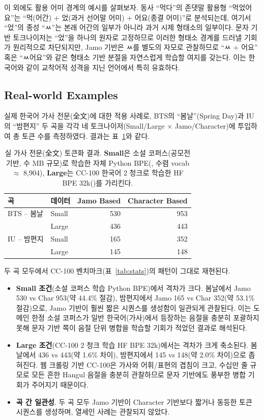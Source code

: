 \documentclass[sigconf,nonacm]{acmart}
\begin{document}
이 외에도 활용 어미 경계의 예시를 살펴보자. 동사 ``먹다''의 존댓말 활용형 ``먹었어요''는
``먹(어간) + 었(과거 선어말 어미) + 어요(종결 어미)''로 분석되는데, 여기서 ``었''의 종성 ``ㅆ''는
본래 어간의 일부가 아니라 과거 시제 형태소의 일부이다. 문자 기반 토크나이저는 ``었''을 하나의
원자로 고정하므로 이러한 형태소 경계를 드러낼 기회가 원리적으로 차단되지만, Jamo 기반은
ㅆ를 별도의 자모로 관찰하므로 ``ㅆ + 어요'' 혹은 ``ㅆ어요''와 같은 형태소 기반 분절을 자연스럽게
학습할 여지를 갖는다. 이는 한국어와 같이 교착어적 성격을 지닌 언어에서 특히 유효하다.

\subsection{Real-world Examples}

실제 한국어 가사 전문(全文)에 대한 적용 사례로, BTS의 ``봄날''(Spring Day)과 IU의
``밤편지'' 두 곡을 각각 네 토크나이저(Small/Large $\times$ Jamo/Character)에 투입하여
총 토큰 수를 측정하였다. 결과는 표~\ref{tab:lyrics}와 같다.

\begin{table}[h]
\caption{실 가사 전문(全文) 토큰화 결과. \textbf{Small}은 소설 코퍼스(공모전 기반, 수 MB 규모)로
학습한 자체 Python BPE(, 수렴 vocab $\approx$ 8{,}904), \textbf{Large}는 CC-100
한국어 2 청크로 학습한 HF BPE 32k()를 가리킨다.}
\label{tab:lyrics}
\small
\begin{tabular}{llrr}
\toprule
곡 & 데이터 & Jamo Based & Character Based \\
\midrule
BTS -- 봄날       & Small & 530 & 953 \\
                  & Large & 436 & 443 \\
\midrule
IU -- 밤편지      & Small & 165 & 352 \\
                  & Large & 145 & 148 \\
\bottomrule
\end{tabular}
\end{table}

두 곡 모두에서 CC-100 벤치마크(표~\ref{tab:stats})의 패턴이 그대로 재현된다.
\begin{itemize}
    \item \textbf{Small 조건}(소설 코퍼스 학습 Python BPE)에서 격차가 크다. 봄날에서 Jamo
    530 vs Char 953(약 44.4\% 절감), 밤편지에서 Jamo 165 vs Char 352(약 53.1\% 절감)으로,
    Jamo 기반이 훨씬 짧은 시퀀스를 생성함이 일관되게 관찰된다. 이는 도메인 한정 소설 코퍼스가
    일반 한국어(가사)에서 등장하는 음절을 충분히 포괄하지 못해 문자 기반 쪽이 음절 단위 병합을
    학습할 기회가 적었던 결과로 해석된다.
    \item \textbf{Large 조건}(CC-100 2 청크 학습 HF BPE 32k)에서는 격차가 크게 축소된다.
    봄날에서 436 vs 443(약 1.6\% 차이), 밤편지에서 145 vs 148(약 2.0\% 차이)으로 좁혀진다.
    웹 크롤링 기반 CC-100은 가사와 어휘/표현의 겹침이 크고, 수십만 줄 규모로 모든 흔한 Hangul
    음절을 충분히 관찰하므로 문자 기반에도 풍부한 병합 기회가 주어지기 때문이다.
    \item \textbf{곡 간 일관성}. 두 곡 모두 Jamo 기반이 Character 기반보다 짧거나 동등한
    토큰 시퀀스를 생성하며, 열세인 사례는 관찰되지 않았다.
\end{itemize}
\end{document}
